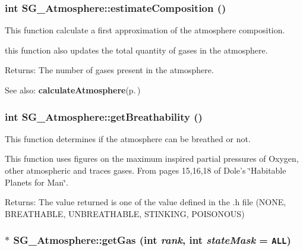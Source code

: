 \subsubsection{\setlength{\rightskip}{0pt plus 5cm}int SG\_\-Atmosphere::estimate\-Composition ()\hspace{0.3cm}{\tt  [protected]}}\label{class_s_g___atmosphere_b0}


This function calculate a first approximation of the atmosphere composition. 

this function also updates the total quantity of gases in the atmosphere. \begin{Desc}
\item[Returns:]The number of gases present in the atmosphere. \end{Desc}
\begin{Desc}
\item[See also:]{\bf calculate\-Atmosphere}{\rm (p.\,\pageref{class_s_g___atmosphere_a2})} \end{Desc}
\subsubsection{\setlength{\rightskip}{0pt plus 5cm}int SG\_\-Atmosphere::get\-Breathability ()}\label{class_s_g___atmosphere_a3}


This function determines if the atmosphere can be breathed or not. 

This function uses figures on the maximum inspired partial pressures of Oxygen, other atmospheric and traces gases. From pages 15,16,18 of Dole's \char`\"{}Habitable Planets for Man\char`\"{}. \begin{Desc}
\item[Returns:]The value returned is one of the value defined in the .h file (NONE, BREATHABLE, UNBREATHABLE, STINKING, POISONOUS) \end{Desc}
\subsubsection{ $\ast$ SG\_\-Atmosphere::get\-Gas (int {\em rank}, int {\em state\-Mask} = {\tt ALL})}\label{class_s_g___atmosphere_a7}


